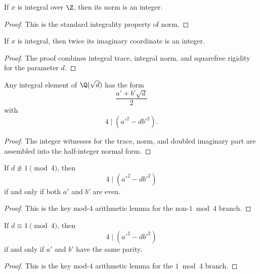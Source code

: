 \begin{lemma}\label{bp_norm_int}
  \leanok
  If $x$ is integral over $\Z$, then its norm is an integer.
\end{lemma}
\begin{proof}
  This is the standard integrality property of norm.
\end{proof}

\begin{lemma}\label{bp_double_im}
  \leanok
  If $x$ is integral, then twice its imaginary coordinate is an integer.
\end{lemma}
\begin{proof}
  The proof combines integral trace, integral norm, and squarefree rigidity for
  the parameter $d$.
\end{proof}

\begin{lemma}\label{bp_halfint}
  \leanok
  Any integral element of $\Q(\sqrt{d})$ has the form
  \[
  \frac{a' + b'\sqrt{d}}{2}
  \]
  with
  \[
  4 \mid (a'^2 - d b'^2).
  \]
\end{lemma}
\begin{proof}
  The integer witnesses for the trace, norm, and doubled imaginary part are
  assembled into the half-integer normal form.
\end{proof}

\begin{lemma}\label{bp_mod4_nonone}
  \leanok
  If $d \not\equiv 1 \pmod 4$, then
  \[
  4 \mid (a'^2 - db'^2)
  \]
  if and only if both $a'$ and $b'$ are even.
\end{lemma}
\begin{proof}
  This is the key mod-$4$ arithmetic lemma for the non-\(1 \bmod 4\) branch.
\end{proof}

\begin{lemma}\label{bp_mod4_one}
  \leanok
  If $d \equiv 1 \pmod 4$, then
  \[
  4 \mid (a'^2 - db'^2)
  \]
  if and only if $a'$ and $b'$ have the same parity.
\end{lemma}
\begin{proof}
  This is the key mod-$4$ arithmetic lemma for the \(1 \bmod 4\) branch.
\end{proof}

